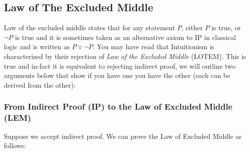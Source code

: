 

\subsection{Law of The Excluded Middle}
Law of the excluded middle states that for any statement $P$, either $P$ is true, or $\neg P$ is true and it is sometimes taken as an alternative axiom to IP in classical logic and is written as $P \lor \neg P$. You may have read that Intuitionism is characterized by their rejection of \textit{Law of the Excluded Middle} (LOTEM). This is true and in-fact it is equivalent to rejecting indirect proof, we will outline two arguments below that show if you have one you have the other (each can be derived from the other):

\subsubsection*{From Indirect Proof (IP) to the Law of Excluded Middle (LEM)}

Suppose we accept indirect proof. We can prove the Law of Excluded Middle as follows:

